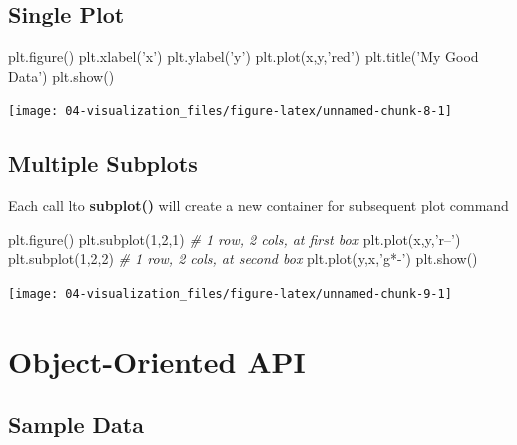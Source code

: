 \documentclass[
]{book}
\newenvironment{Shaded}{\begin{snugshade}}{\end{snugshade}}
\newcommand{\CommentTok}[1]{\textcolor[rgb]{0.37,0.37,0.37}{\textit{#1}}}
\newcommand{\DecValTok}[1]{\textcolor[rgb]{0.06,0.06,0.06}{#1}}
\newcommand{\NormalTok}[1]{#1}
\newcommand{\StringTok}[1]{\textcolor[rgb]{0.5,0.5,0.5}{#1}}
\begin{document}
\hypertarget{single-plot}{%
\subsection{Single Plot}\label{single-plot}}

\begin{Shaded}
\begin{Highlighting}[]
\NormalTok{plt.figure()}
\NormalTok{plt.xlabel(}\StringTok{'x'}\NormalTok{)}
\NormalTok{plt.ylabel(}\StringTok{'y'}\NormalTok{)}
\NormalTok{plt.plot(x,y,}\StringTok{'red'}\NormalTok{)}
\NormalTok{plt.title(}\StringTok{'My Good Data'}\NormalTok{)}
\NormalTok{plt.show()}
\end{Highlighting}
\end{Shaded}

\texttt{[image: 04-visualization\_files/figure-latex/unnamed-chunk-8-1]}

\hypertarget{multiple-subplots}{%
\subsection{Multiple Subplots}\label{multiple-subplots}}

Each call lto \textbf{subplot()} will create a new container for subsequent plot command

\begin{Shaded}
\begin{Highlighting}[]
\NormalTok{plt.figure()}
\NormalTok{plt.subplot(}\DecValTok{1}\NormalTok{,}\DecValTok{2}\NormalTok{,}\DecValTok{1}\NormalTok{) }\CommentTok{# 1 row, 2 cols, at first box}
\NormalTok{plt.plot(x,y,}\StringTok{'r--'}\NormalTok{)}
\NormalTok{plt.subplot(}\DecValTok{1}\NormalTok{,}\DecValTok{2}\NormalTok{,}\DecValTok{2}\NormalTok{) }\CommentTok{# 1 row, 2 cols, at second box}
\NormalTok{plt.plot(y,x,}\StringTok{'g*-'}\NormalTok{)}
\NormalTok{plt.show()}
\end{Highlighting}
\end{Shaded}

\texttt{[image: 04-visualization\_files/figure-latex/unnamed-chunk-9-1]}

\hypertarget{object-oriented-api}{%
\section{Object-Oriented API}\label{object-oriented-api}}

\hypertarget{sample-data-18}{%
\subsection{Sample Data}\label{sample-data-18}}
\end{document}
